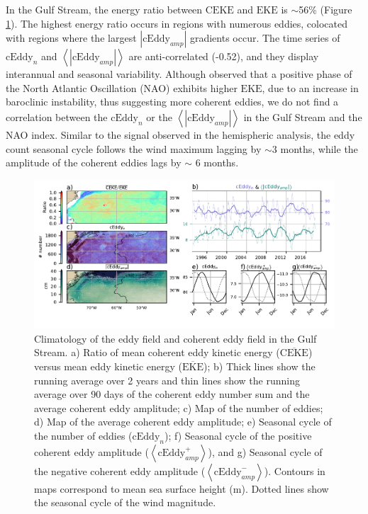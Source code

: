 \documentclass[draft,linenumbers]{agujournal2019}
\newcommand{\MEKE}{\overline{\textrm{EKE}}}
\newcommand{\EKE}{\textrm{EKE}}
\newcommand{\MCEKE}{\overline{\textrm{CEKE}}}
\newcommand{\CEKE}{\textrm{CEKE}}
\newcommand{\cEddy}{\textrm{cEddy}}
\begin{document}
	In the Gulf Stream, the energy ratio between $\CEKE$ and $\EKE$ is $\sim$56\% (Figure \ref{fig:Gulf_Stream}). 
	The highest energy ratio occurs in regions with numerous eddies, colocated with regions where the largest $|\cEddy_{amp}|$ gradients occur. 
	The time series of $\cEddy_{n}$ and $\left<|\cEddy_{amp}|\right>$ are anti-correlated (-0.52), and they display interannual and seasonal variability. 
	Although \citet{Chaudhuri_Oscillation_2009} observed that a positive phase of the North Atlantic Oscillation (NAO) exhibits higher $\EKE$, due to an increase in baroclinic instability, thus suggesting more coherent eddies, we do not find a correlation between the $\cEddy_{n}$ or the $\left<|\cEddy_{amp}|\right>$ in the Gulf Stream and the NAO index. 
	Similar to the signal observed in the hemispheric analysis, the eddy count seasonal cycle follows the wind maximum lagging by $\sim$3 months, while the amplitude of the coherent eddies lags by $\sim$ 6 months. 

	\begin{figure}
	    \centering
	    \includegraphics[width=1\textwidth]{./figures/regional_ratios_and_stats_V3_5.pdf}
	    \caption{Climatology of the eddy field and coherent eddy field in the Gulf Stream. a) Ratio of mean coherent eddy kinetic energy ($\MCEKE$) versus mean eddy kinetic energy ($\MEKE$); b) Thick lines show the running average over 2 years and thin lines show the running average over 90 days of the coherent eddy number sum and the average coherent eddy amplitude; c) Map of the number of eddies; d) Map of the average coherent eddy amplitude; e) Seasonal cycle of the number of eddies ($\cEddy_n$); f) Seasonal cycle of the positive coherent eddy amplitude ($\left<\cEddy_{amp}^+\right>$), and g) Seasonal cycle of the negative coherent eddy amplitude ($\left<\cEddy_{amp}^-\right>$). Contours in maps correspond to mean sea surface height (m). Dotted lines show the seasonal cycle of the wind magnitude.}
	    \label{fig:Gulf_Stream}
	\end{figure}
\end{document}
